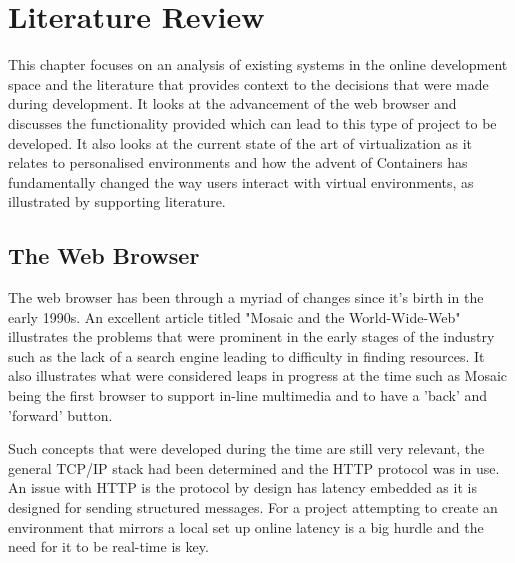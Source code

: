 
\chapter{Literature Review} \label{lit}

This chapter focuses on an analysis of existing systems in the online development space and the literature that provides context to the decisions that were made during development. It looks at the advancement of the web browser and discusses the functionality provided which can lead to this type of project to be developed. It also looks at the current state of the art of virtualization as it relates to personalised environments and how the advent of Containers has fundamentally changed the way users interact with virtual environments, as illustrated by supporting literature.

\section{The Web Browser} \label{lit-web}

The web browser has been through a myriad of changes since it's birth in the early 1990s. An excellent article titled "Mosaic and the World-Wide-Web"\cite{mosaic} illustrates the problems that were prominent in the early stages of the industry such as the lack of a search engine leading to difficulty in finding resources. It also illustrates what were considered leaps in progress at the time such as Mosaic being the first browser to support in-line multimedia and to have a 'back' and 'forward' button.

Such concepts that were developed during the time are still very relevant, the general TCP/IP stack had been determined and the HTTP protocol was in use. An issue with HTTP is the protocol by design has latency embedded as it is designed for sending structured messages. For a project attempting to create an environment that mirrors a local set up online latency is a big hurdle and the need for it to be real-time is key. 

